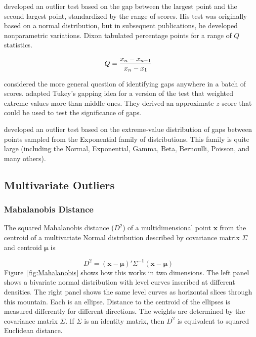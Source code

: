 \documentclass[12pt]{article}
\begin{document}
 \cite{DixonOutlierTest} developed an outlier test based on the gap between the largest point and the second largest point, standardized by the range of scores. His test was originally based on a normal distribution, but in subsequent publications, he developed nonparametric variations. Dixon tabulated percentage points for a range of $Q$ statistics.

\begin{equation*}
Q = {{x_n - x_{n-1}} \over {x_n - x_1}}
\end{equation*}

\cite{EDA} considered the more general question of identifying gaps anywhere in a batch of scores. \cite{WainerSchacht} adapted Tukey's gapping idea for a version of the test that weighted extreme values more than middle ones. They derived an approximate $z$ score that could be used to test the significance of gaps.

\cite{BurridgeTaylor} developed an outlier test based on the extreme-value distribution of gaps between points sampled from the Exponential family of distributions. This family is quite large (including the Normal, Exponential, Gamma, Beta, Bernoulli, Poisson, and many others). 

\subsection{Multivariate Outliers}
\subsubsection{Mahalanobis Distance}
The squared Mahalanobis distance ($D^2$) of a multidimensional point $\mathbf{x}$ from the centroid of a multivariate Normal distribution described by covariance matrix $\Sigma$ and centroid $\boldsymbol{\mu}$ is

\begin{equation*}
D^2 = (\mathbf{x}- \boldsymbol{\mu})'\Sigma ^{-1}(\mathbf{x}- \boldsymbol{\mu})
\end{equation*}
Figure~\ref{fig:Mahalanobis} shows how this works in two dimensions. The left panel shows a bivariate normal distribution with level curves inscribed at different densities. The right panel shows the same level curves as horizontal slices through this mountain. Each is an ellipse. Distance to the centroid of the ellipses is measured differently for different directions. The weights are determined by the covariance matrix $\Sigma$. If  $\Sigma$ is an identity matrix, then $D^2$ is equivalent to squared Euclidean distance.
\end{document}
